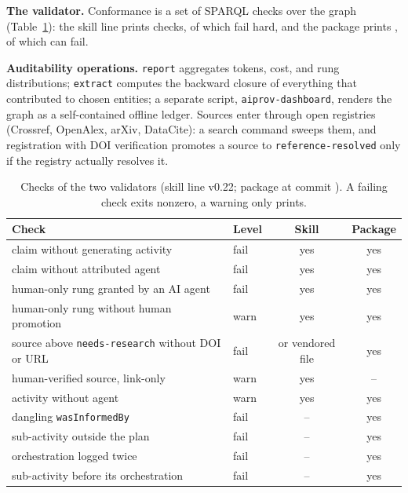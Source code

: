 \textbf{The validator.} Conformance is a set of SPARQL checks over the
graph (Table~\ref{tab:checks}): the skill line prints \MChkSkill{}
checks, \MChkSkillFail{} of which fail hard, and the package prints
\MChkPkg{}, \MChkPkgFail{} of which can fail.

\textbf{Auditability operations.} \texttt{report} aggregates tokens,
cost, and rung distributions; \texttt{extract} computes the backward
closure of everything that contributed to chosen entities; a separate
script, \texttt{aiprov-dashboard}, renders the graph as a
self-contained offline ledger. Sources enter through open registries (Crossref, OpenAlex,
arXiv, DataCite): a search command sweeps them, and registration with
DOI verification promotes a source to \texttt{reference-resolved} only
if the registry actually resolves it.

\begin{table}[t]
\caption{Checks of the two validators (skill line v0.22; package at
commit \MChkPkgCommit). A failing check exits nonzero, a warning only prints.}
\label{tab:checks}
\centering
\footnotesize
\begin{tabular}{p{4.3cm}lcc}
\toprule
Check & Level & Skill & Package \\
\midrule
claim without generating activity & fail & yes & yes \\
claim without attributed agent & fail & yes & yes \\
human-only rung granted by an AI agent & fail & yes & yes \\
human-only rung without human promotion & warn & yes & yes \\
source above \texttt{needs-research} without DOI or URL & fail & or vendored file & yes \\
human-verified source, link-only & warn & yes & -- \\
activity without agent & warn & yes & yes \\
dangling \texttt{wasInformedBy} & fail & -- & yes \\
sub-activity outside the plan & fail & -- & yes \\
orchestration logged twice & fail & -- & yes \\
sub-activity before its orchestration & fail & -- & yes \\
\bottomrule
\end{tabular}
\end{table}

